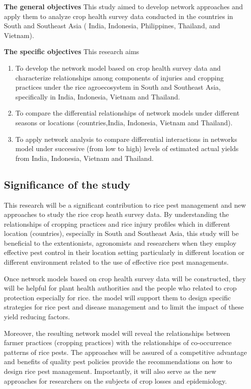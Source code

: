 \textbf{The general objectives}
This study aimed to develop network approaches and apply them to analyze crop health survey data conducted in the countries in South and Southeast Asia ( India, Indonesia, Philippines, Thailand, and Vietnam). 

\textbf{The specific objectives}
This research aims 
\begin{enumerate}
\item To develop the network model based on crop health survey data and characterize relationships among components of injuries and cropping practices under the rice agroecosystem in South and Southeast Asia, specifically in India, Indonesia, Vietnam and Thailand.
\item To compare the differential relationships of network models under different seasons or locations (countries,India, Indonesia, Vietnam and Thailand). 
\item To apply network analysis to compare differential interactions in networks model under successive (from low to high) levels of estimated actual yields from India, Indonesia, Vietnam and Thailand.
\end{enumerate}

\subsection{Significance of the study}

This research will be a significant contribution to rice pest management and  new approaches to study the rice crop heath survey data. By understanding the relationships of cropping practices and rice injury profiles which in different location (countries), especially in South and Southeast Asia, this study will be beneficial to the extentionists, agronomists and researchers when they employ effective pest control in their location setting particularly in different location or different environment related to the use of effective rice pest managements.

Once network models based on crop health survey data will be constructed, they will be helpful for plant health authorities and the people who related to crop protection especially for rice. the model will support them to design specific strategies for rice pest and disease management and to limit the impact of these yield reducing factors.

Moreover, the resulting network model will reveal the relationships between farmer practices (cropping practices) with the relationships of co-occurrence patterns of rice pests. The approaches will be assured of a competitive advantage and benefits of quality pest policies provide the recommendations on how to design rice pest management. Importantly, it will also serve as the new approaches for researchers on the subjects of crop losses  and epidemiology.

